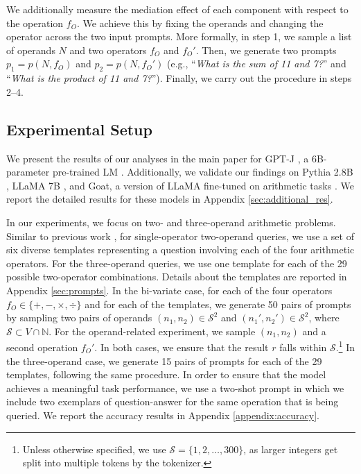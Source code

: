 \documentclass[11pt]{article}
\begin{document}
We additionally measure the mediation effect of each component with respect to the operation $f_O$. We achieve this by fixing the operands and changing the operator across the two input prompts. More formally, in step 1, we sample a list of operands $N$ and two operators $f_O$ and $f_O'$. Then, we generate two prompts $p_1 = p(N, f_O)$ and $p_2 = p(N, f_O')$ (e.g., ``\textit{What is the sum of 11 and 7?}'' and ``\textit{What is the product of 11 and 7?}''). Finally, we carry out the procedure in steps 2--4.


\subsection{Experimental Setup}
We present the results of our analyses in the main paper for GPT-J \cite{gpt-j}, a 6B-parameter pre-trained LM \cite{gao2020pile}. Additionally, we validate our findings on Pythia 2.8B \cite{biderman2023pythia}, LLaMA 7B \cite{touvron2023llama}, and Goat, a version of LLaMA fine-tuned on arithmetic tasks \cite{liu2023goat}. We report the detailed results for these models in Appendix \ref{sec:additional_res}.

In our experiments, we focus on two- and three-operand arithmetic problems.
Similar to previous work \cite{razeghi-etal-2022-impact, karpas2022mrkl}, for single-operator two-operand queries, we use a set of six diverse templates representing a question involving each of the four arithmetic operators. For the three-operand queries, we use one template for each of the 29 possible two-operator combinations. Details about the templates are reported in Appendix \ref{sec:prompts}.
In the bi-variate case, for each of the four operators $f_O \in \{+, -, \times, \div\}$ and for each of the templates, we generate 50 pairs of prompts by sampling two pairs of operands $(n_1, n_2) \in \mathcal{S}^2$ and $(n_1', n_2') \in \mathcal{S}^2$, where $\mathcal{S} \subset V \cap \mathbb{N}$. For the operand-related experiment, we sample $(n_1, n_2)$ and a second operation $f_O'$. In both cases, we ensure that the result $r$ falls within $\mathcal{S}$.\footnote{Unless otherwise specified, we use $\mathcal{S} = \{1,2,\dots, 300 \}$, as larger integers get split into multiple tokens by the tokenizer.}
In the three-operand case, we generate 15 pairs of prompts for each of the 29 templates, following the same procedure.
In order to ensure that the model achieves a meaningful task performance, we use a two-shot prompt in which we include two exemplars of question-answer for the same operation that is being queried. We report the accuracy results in Appendix \ref{appendix:accuracy}.
\end{document}
